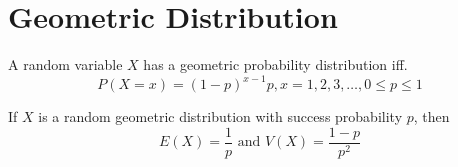 \section{Geometric Distribution}
\begin{definition}
    A random variable $X$ has a geometric probability distribution iff.
    \[P(X=x) = (1-p)^{x-1}p, x = 1,2,3, \ldots, 0 \leq p \leq 1\]
\end{definition}

\begin{theorem}
    If $X$ is a random geometric distribution with success probability $p$, then
    \[
        E(X) = \frac{1}{p} \text{ and } V(X) = \frac{1-p}{p^2}
    \]
\end{theorem}

